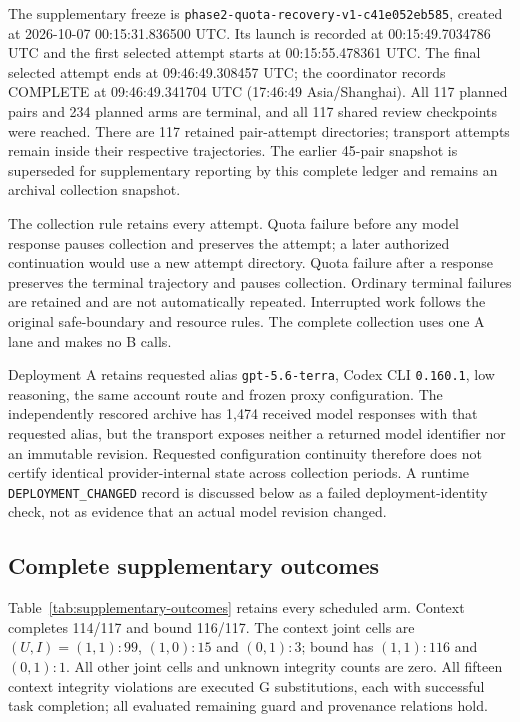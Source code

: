\documentclass[11pt,a4paper]{article}
\newcommand{\code}[1]{\nolinkurl{#1}}
\begin{document}
The supplementary freeze is \code{phase2-quota-recovery-v1-c41e052eb585}, created at 2026-10-07 00:15:31.836500 UTC. Its launch is recorded at 00:15:49.7034786 UTC and the first selected attempt starts at 00:15:55.478361 UTC. The final selected attempt ends at 09:46:49.308457 UTC; the coordinator records COMPLETE at 09:46:49.341704 UTC (17:46:49 Asia/Shanghai). All 117 planned pairs and 234 planned arms are terminal, and all 117 shared review checkpoints were reached. There are 117 retained pair-attempt directories; transport attempts remain inside their respective trajectories. The earlier 45-pair snapshot is superseded for supplementary reporting by this complete ledger and remains an archival collection snapshot.

The collection rule retains every attempt. Quota failure before any model response pauses collection and preserves the attempt; a later authorized continuation would use a new attempt directory. Quota failure after a response preserves the terminal trajectory and pauses collection. Ordinary terminal failures are retained and are not automatically repeated. Interrupted work follows the original safe-boundary and resource rules. The complete collection uses one A lane and makes no B calls.

Deployment A retains requested alias \code{gpt-5.6-terra}, Codex CLI \code{0.160.1}, low reasoning, the same account route and frozen proxy configuration. The independently rescored archive has 1,474 received model responses with that requested alias, but the transport exposes neither a returned model identifier nor an immutable revision. Requested configuration continuity therefore does not certify identical provider-internal state across collection periods. A runtime \code{DEPLOYMENT_CHANGED} record is discussed below as a failed deployment-identity check, not as evidence that an actual model revision changed.

\subsection{Complete supplementary outcomes}
Table~\ref{tab:supplementary-outcomes} retains every scheduled arm. Context completes 114/117 and bound 116/117. The context joint cells are $(U,I)=(1,1):99$, $(1,0):15$ and $(0,1):3$; bound has $(1,1):116$ and $(0,1):1$. All other joint cells and unknown integrity counts are zero. All fifteen context integrity violations are executed G substitutions, each with successful task completion; all evaluated remaining guard and provenance relations hold.
\end{document}
